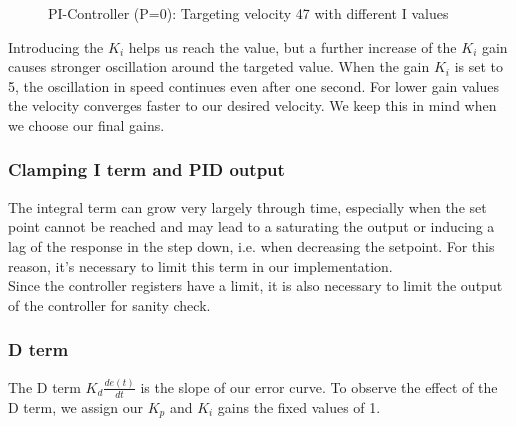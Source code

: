 \begin{figure}[H]
    \centering
{}
    \caption{PI-Controller (P=0): Targeting velocity 47 with different I values} \label{fig:I_demo}
\end{figure}

Introducing the $K_i$ helps us reach the value, but a further increase of the $K_i$ gain causes stronger oscillation around the targeted value. When the gain $K_i$ is set to 5, the oscillation in speed continues even after one second. For lower gain values the velocity converges faster to our desired velocity. We keep this in mind when we choose our final gains.

\subsubsection*{Clamping I term and PID output}

The integral term can grow very largely through time, especially when the set point cannot be reached and may lead to a saturating the output or inducing a lag of the response in the step down, i.e. when decreasing the setpoint. For this reason, it’s necessary to limit this term in our implementation.\\
Since the controller registers have a limit, it is also necessary to limit the output of the controller for sanity check. 

\subsubsection*{D term}
The D term
$K_d \frac{de(t)}{dt}$
is the slope of our error curve. To observe the effect of the D term, we assign our $K_p$ and $K_i$ gains the fixed values of 1.

